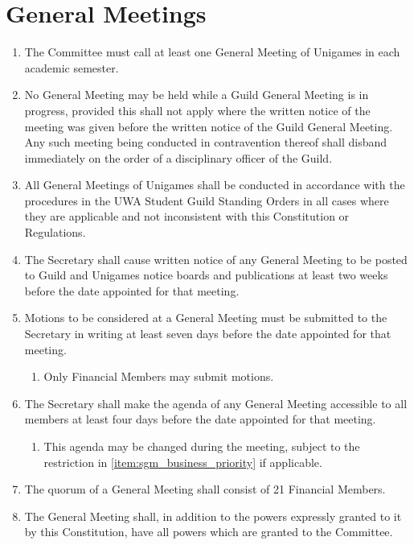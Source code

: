 \documentclass[a4paper]{article}
\begin{document}
\section{General Meetings} \label{sec:general_meetings}
\begin{enumerate}
    \item The Committee must call at least one General Meeting of Unigames in each academic semester.
    \item No General Meeting may be held while a Guild General Meeting is in progress, provided this shall not apply where the written notice of the meeting was given before the written notice of the Guild General Meeting. Any such meeting being conducted in contravention thereof shall disband immediately on the order of a disciplinary officer of the Guild.
    \item All General Meetings of Unigames shall be conducted in accordance with the procedures in the UWA Student Guild Standing Orders in all cases where they are applicable and not inconsistent with this Constitution or Regulations.
    \item The Secretary shall cause written notice of any General Meeting to be posted to Guild and Unigames notice boards and publications at least two weeks before the date appointed for that meeting.
    \item Motions to be considered at a General Meeting must be submitted to the Secretary in writing at least seven days before the date appointed for that meeting.
          \begin{enumerate}
              \item Only Financial Members may submit motions.
          \end{enumerate}
    \item The Secretary shall make the agenda of any General Meeting accessible to all members at least four days before the date appointed for that meeting.
          \begin{enumerate}
              \item This agenda may be changed during the meeting, subject to the restriction in \cref{item:sgm_business_priority} if applicable.
          \end{enumerate}
    \item The quorum of a General Meeting shall consist of 21 Financial Members.
    \item The General Meeting shall, in addition to the powers expressly granted to it by this Constitution, have all powers which are granted to the Committee.

\end{enumerate}
\end{document}
